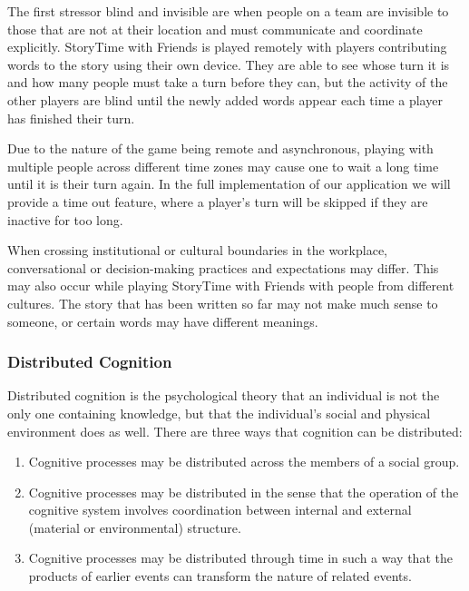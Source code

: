 \documentclass{sigchi}
\begin{document}
The first stressor blind and invisible are when people on a team are invisible to those that are not at their location and must communicate and coordinate explicitly. StoryTime with Friends is played remotely with players contributing words to the story using their own device. They are able to see whose turn it is and how many people must take a turn before they can, but the activity of the other players are blind until the newly added words appear each time a player has finished their turn.

Due to the nature of the game being remote and asynchronous, playing with multiple people across different time zones may cause one to wait a long time until it is their turn again. In the full implementation of our application we will provide a time out feature, where a player's turn will be skipped if they are inactive for too long.

When crossing institutional or cultural boundaries in the workplace, conversational or decision-making practices and expectations may differ. This may also occur while playing StoryTime with Friends with people from different cultures. The story that has been written so far may not make much sense to someone, or certain words may have different meanings. 

\subsubsection{Distributed Cognition}
Distributed cognition is the psychological theory that an individual is not the only one containing knowledge, but that the individual's social and physical environment does as well. There are three ways that cognition can be distributed: 
	
\begin{enumerate}[leftmargin=.5in,noitemsep]
\item Cognitive processes may be distributed across the members of a social group.
\item Cognitive processes may be distributed in the sense that the operation of the cognitive system involves coordination between internal and external (material or environmental) structure.
\item Cognitive processes may be distributed through time in such a way that the products of earlier events can transform the nature of related events. 
\end{enumerate}
\end{document}
